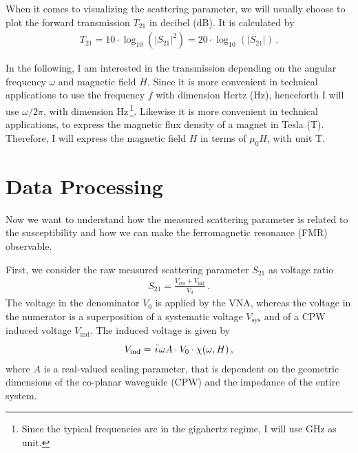 When it comes to visualizing the scattering parameter, we will usually choose to plot the forward transmission $T_{21}$ in decibel (dB). It is calculated by
\begin{align}
    T_{21}=10\cdot \log_{10} \left( |S_{21}|^2 \right)
          =20\cdot \log_{10} \left( |S_{21}|\right)\,.
\end{align}

In the following, I am interested in the transmission depending on the angular frequency $\omega$ and magnetic field $H$. Since it is more convenient in technical applications to use the frequency $f$ with dimension Hertz (Hz), henceforth I will use $\omega/2\pi$, with dimension Hz\,\footnote{Since the typical frequencies are in the gigahertz regime, I will use GHz as unit.}. Likewise it is more convenient in technical applications, to express the magnetic flux density of a magnet in Tesla (T). Therefore, I will express the magnetic field $H$ in terms of $\mu_0H$, with unit T. \cite{ZNB40manual}

\section{Data Processing} \label{sec:data_processing}
Now we want to understand how the measured scattering parameter is related to the susceptibility and how we can make the ferromagnetic resonance (FMR) observable.

First, we consider the raw measured scattering parameter $S_{21}$ as voltage ratio
\begin{align}
    S_{21}=\frac{V_\text{sys}+V_\text{ind}}{V_0}\,.
\end{align}
The voltage in the denominator $V_0$ is applied by the VNA, whereas the voltage in the numerator is a superposition of a systematic voltage $V_\text{sys}$ and of a CPW induced voltage $V_\text{ind}$.
The induced voltage is given by
\begin{align}
    V_\text{ind}=\ima\omega A\cdot V_0 \cdot \chi(\omega,H)\,,
\end{align}
where $A$ is a real-valued scaling parameter, that is dependent on the geometric dimensions of the co-planar waveguide (CPW) and the impedance of the entire system.

